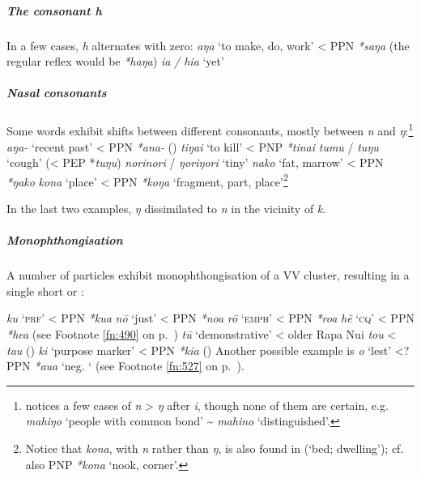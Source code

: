 \subparagraph{The consonant \textit{h}} In a few cases, \textit{h} alternates with zero: 
\ea
\ea
\textit{aŋa} ‘to make, do, work’ {\textless} PPN \textit{*saŋa} (the regular reflex would be \textit{*haŋa})
\ex
\textit{ia} \textit{/ hia} ‘yet’
\z
\z

\newpage 
\subparagraph{Nasal consonants} Some words exhibit shifts between different  consonants, mostly between \textit{n} and \textit{ŋ}:\footnote{\label{fn:66}\citet[10]{Blixen1972} notices a few cases of \textit{n} > \textit{ŋ} after \textit{i}, though none of them are certain, e.g. \textit{mahiŋo} ‘people with common bond’ {\textasciitilde}  \textit{mahino} ‘distinguished’.}
\ea
\ea
\textit{{\ꞌ}aŋa-} ‘recent past’ {\textless} PPN \textit{*{\ꞌ}ana-} ()
\ex
\textit{tiŋa{\ꞌ}i} ‘to kill’ {\textless} PNP \textit{*tina{\ꞌ}i}
\ex
\textit{tumu} / \textit{tuŋu} ‘cough’ ({\textless} PEP *\textit{tuŋu})
\ex
\textit{norinori} / \textit{ŋoriŋori} ‘tiny’
\ex
\textit{nako} ‘fat, marrow’ {\textless} PPN \textit{*ŋako}
\ex
\textit{kona} ‘place’ {\textless} PPN \textit{*koŋa} ‘fragment, part, place’\footnote{\label{fn:67}Notice that \textit{kona}, with \textit{n} rather than \textit{ŋ}, is also found in  (‘bed; dwelling’); cf. also PNP \textit{*kona} ‘nook, corner’.}
\z
\z

In the last two examples, \textit{ŋ} dissimilated to \textit{n} in the vicinity of \textit{k}.

\subparagraph{Monophthongisation} A number of particles exhibit monophthongisation of a VV cluster, resulting in a single short or :

\ea
\ea
\textit{ku} ‘\textsc{prf}’ {\textless} PPN \textit{*kua}
\ex
\textit{nō} ‘just’ {\textless} PPN \textit{*noa}
\ex
\textit{rō} ‘\textsc{emph}’ {\textless} PPN \textit{*roa}
\ex
\textit{hē} ‘\textsc{cq}’ {\textless} PPN \textit{*hea} (see Footnote \ref{fn:490} on p.~\pageref{fn:490})
\ex
\textit{tū} ‘demonstrative’ {\textless} older Rapa Nui \textit{tou} {\textless} \textit{tau} ()
\ex
\textit{ki} ‘purpose marker’ {\textless} PPN \textit{*kia} ()
\ex
Another possible example is \textit{{\ꞌ}o} ‘lest’ {\textless}? PPN \textit{*{\ꞌ}aua} ‘neg. ‘ (see Footnote \ref{fn:527} on p.~\pageref{fn:527}).
\z
\z

